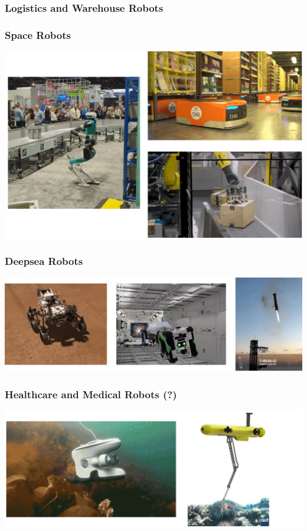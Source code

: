 \documentclass[10pt]{article}
\begin{document}
\subsubsection*{Logistics and Warehouse Robots}

\subsubsection*{Space Robots}
\begin{center} 
	\includegraphics*[width=\textwidth]{L1_1.png} 
\end{center}
\subsubsection*{Deepsea Robots}
\begin{center} 
	\includegraphics*[width=\textwidth]{L1_2.png} 
\end{center}
\subsubsection*{Healthcare and Medical Robots (?)}
\begin{center} 
	\includegraphics*[width=\textwidth]{L1_3.png} 
\end{center}
\end{document}

